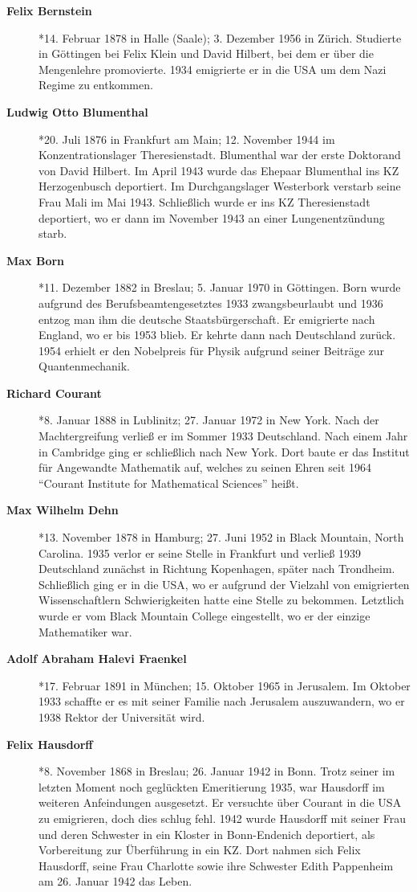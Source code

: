 \begin{description}
\item[\textbf{Felix Bernstein}] *14. Februar 1878 in Halle (Saale); 3. Dezember 1956 in Zürich. Studierte in Göttingen bei Felix Klein und David Hilbert, bei dem er über die Mengenlehre promovierte. 1934 emigrierte er in die USA um dem Nazi Regime zu entkommen.
\item[\textbf{Ludwig Otto Blumenthal}] *20. Juli 1876 in Frankfurt am Main; 12. November 1944 im Konzentrationslager Theresienstadt. Blumenthal war der erste Doktorand von David Hilbert. Im April 1943 wurde das Ehepaar Blumenthal ins KZ Herzogenbusch deportiert. Im Durchgangslager Westerbork verstarb seine Frau Mali im Mai 1943. Schließlich wurde er ins KZ Theresienstadt deportiert, wo er dann im November 1943 an einer Lungenentzündung starb.
\item[\textbf{Max Born}] *11. Dezember 1882 in Breslau; 5. Januar 1970 in Göttingen. Born wurde aufgrund des Berufsbeamtengesetztes 1933 zwangsbeurlaubt und 1936 entzog man ihm die deutsche Staatsbürgerschaft. Er emigrierte nach England, wo er bis 1953 blieb. Er kehrte dann nach Deutschland zurück. 1954 erhielt er den Nobelpreis für Physik aufgrund seiner Beiträge zur Quantenmechanik.
\item[\textbf{Richard Courant}] *8. Januar 1888 in Lublinitz; 27. Januar 1972 in New York. Nach der Machtergreifung verließ er im Sommer 1933 Deutschland. Nach einem Jahr in Cambridge ging er schließlich nach New York. Dort baute er das Institut für Angewandte Mathematik auf, welches zu seinen Ehren seit 1964 "`Courant Institute for Mathematical Sciences"' heißt.
\item[\textbf{Max Wilhelm Dehn}] *13. November 1878 in Hamburg; 27. Juni 1952 in Black Mountain, North Carolina. 1935 verlor er seine Stelle in Frankfurt und verließ 1939 Deutschland zunächst in Richtung Kopenhagen, später nach Trondheim. Schließlich ging er in die USA, wo er aufgrund der Vielzahl von emigrierten Wissenschaftlern Schwierigkeiten hatte eine Stelle zu bekommen. Letztlich wurde er vom Black Mountain College eingestellt, wo er der einzige Mathematiker war. 
\item[\textbf{Adolf Abraham Halevi Fraenkel}] *17. Februar 1891 in München; 15. Oktober 1965 in Jerusalem. Im Oktober 1933 schaffte er es mit seiner Familie nach Jerusalem auszuwandern, wo er 1938 Rektor der Universität wird. 
\item[\textbf{Felix Hausdorff}] *8. November 1868 in Breslau; 26. Januar 1942 in Bonn. Trotz seiner im letzten Moment noch geglückten Emeritierung 1935, war Hausdorff im weiteren Anfeindungen ausgesetzt. Er versuchte über Courant in die USA zu emigrieren, doch dies schlug fehl. 1942 wurde Hausdorff mit seiner Frau und deren Schwester in ein Kloster in Bonn-Endenich deportiert, als Vorbereitung zur Überführung in ein KZ. Dort nahmen sich Felix Hausdorff, seine Frau Charlotte sowie ihre Schwester Edith Pappenheim am 26. Januar 1942 das Leben.

\end{description}
